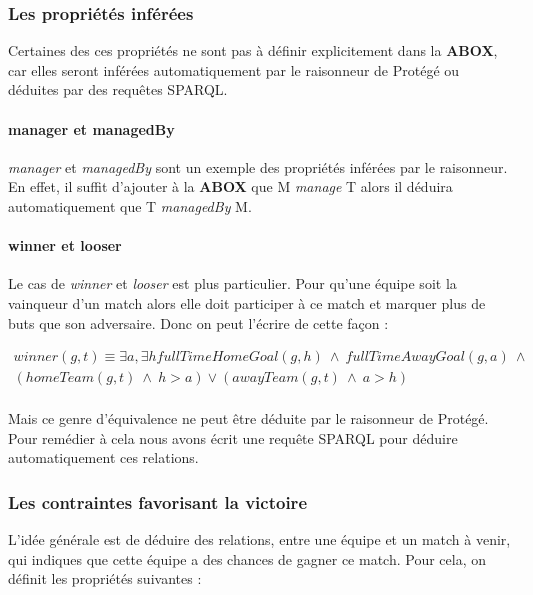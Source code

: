\documentclass[oneside,13pt,a4paper]{article}
\begin{document}
\subsubsection{Les propriétés inférées}

Certaines des ces propriétés ne sont pas à définir explicitement dans la \textbf{ABOX}, car elles seront inférées automatiquement par le raisonneur de Protégé ou déduites par des requêtes SPARQL.

\paragraph{manager et managedBy}

\textit{manager} et \textit{managedBy} sont un exemple des propriétés inférées par le raisonneur. En effet, il suffit d'ajouter à la \textbf{ABOX} que M \textit{manage} T alors il déduira automatiquement que T \textit{managedBy} M.

\paragraph{winner et looser}
\label{winner}

Le cas de \textit{winner} et \textit{looser} est plus particulier. Pour qu’une équipe soit la vainqueur d’un match alors elle doit participer à ce match et marquer plus de buts que son adversaire. Donc on peut l’écrire de cette façon :

\begin{multline*}
winner(g,t) \equiv \exists a,\exists h  fullTimeHomeGoal(g,h) \ \wedge \ fullTimeAwayGoal(g, a) \ \wedge \ \\
  (homeTeam(g,t) \ \wedge \ h > a)  \vee (awayTeam(g,t) \ \wedge \  a > h) \\
\end{multline*}

Mais ce genre d'équivalence ne peut être déduite par le raisonneur de Protégé. Pour remédier à cela nous avons écrit une requête SPARQL pour déduire automatiquement ces relations.



\subsubsection{Les contraintes favorisant la victoire}

L'idée générale est de déduire des relations, entre une équipe et un match à venir, qui indiques que cette équipe a des chances de gagner ce match. Pour cela, on définit les propriétés suivantes : 
\end{document}
